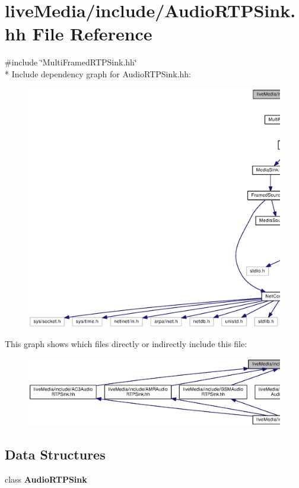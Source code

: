 \section{live\+Media/include/\+Audio\+R\+T\+P\+Sink.hh File Reference}
\label{AudioRTPSink_8hh}
{\ttfamily \#include \char`\"{}Multi\+Framed\+R\+T\+P\+Sink.\+hh\char`\"{}}\\*
Include dependency graph for Audio\+R\+T\+P\+Sink.\+hh\+:
\nopagebreak
\begin{figure}[H]
\begin{center}
\leavevmode
\includegraphics[width=350pt]{AudioRTPSink_8hh__incl}
\end{center}
\end{figure}
This graph shows which files directly or indirectly include this file\+:
\nopagebreak
\begin{figure}[H]
\begin{center}
\leavevmode
\includegraphics[width=350pt]{AudioRTPSink_8hh__dep__incl}
\end{center}
\end{figure}
\subsection*{Data Structures}
\begin{DoxyCompactItemize}
\item 
class {\bf Audio\+R\+T\+P\+Sink}
\end{DoxyCompactItemize}

